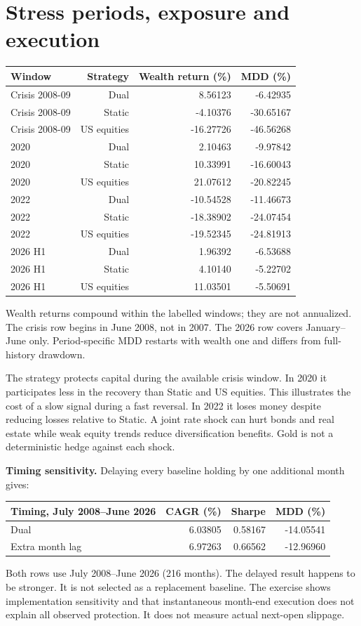 \documentclass[11pt,letterpaper]{article}
\begin{document}
\newpage
\section{Stress periods, exposure and execution}
\begin{center}\small\begin{tabular}{lrrr}\toprule
Window & Strategy & Wealth return (\%) & MDD (\%)\\\midrule
Crisis 2008-09 & Dual & 8.56123 & -6.42935\\
Crisis 2008-09 & Static & -4.10376 & -30.65167\\
Crisis 2008-09 & US equities & -16.27726 & -46.56268\\
2020 & Dual & 2.10463 & -9.97842\\
2020 & Static & 10.33991 & -16.60043\\
2020 & US equities & 21.07612 & -20.82245\\
2022 & Dual & -10.54528 & -11.46673\\
2022 & Static & -18.38902 & -24.07454\\
2022 & US equities & -19.52345 & -24.81913\\
2026 H1 & Dual & 1.96392 & -6.53688\\
2026 H1 & Static & 4.10140 & -5.22702\\
2026 H1 & US equities & 11.03501 & -5.50691\\
\bottomrule\end{tabular}\end{center}
Wealth returns compound within the labelled windows; they are not annualized. The crisis row begins in June 2008, not in 2007. The 2026 row covers January--June only. Period-specific MDD restarts with wealth one and differs from full-history drawdown.

The strategy protects capital during the available crisis window. In 2020 it participates less in the recovery than Static and US equities. This illustrates the cost of a slow signal during a fast reversal. In 2022 it loses money despite reducing losses relative to Static. A joint rate shock can hurt bonds and real estate while weak equity trends reduce diversification benefits. Gold is not a deterministic hedge against each shock.

\textbf{Timing sensitivity.} Delaying every baseline holding by one additional month gives:
\begin{center}\small\begin{tabular}{lrrr}\toprule
Timing, July 2008--June 2026 & CAGR (\%) & Sharpe & MDD (\%)\\\midrule
Dual & 6.03805 & 0.58167 & -14.05541\\
Extra month lag & 6.97263 & 0.66562 & -12.96960\\
\bottomrule\end{tabular}\end{center}
Both rows use July 2008--June 2026 (216 months). The delayed result happens to be stronger. It is not selected as a replacement baseline. The exercise shows implementation sensitivity and that instantaneous month-end execution does not explain all observed protection. It does not measure actual next-open slippage.
\end{document}
